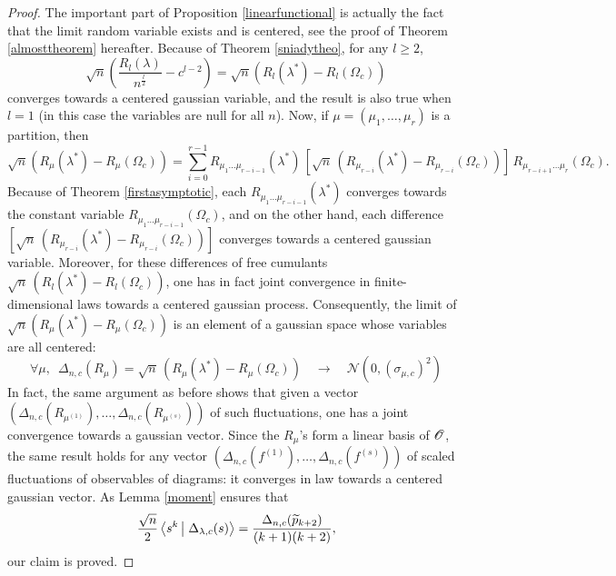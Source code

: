 \documentclass[10pt]{amsart}
\begin{document}
\begin{proof}
The important part of Proposition \ref{linearfunctional} is actually the fact that the limit random variable exists and is centered, see the proof of Theorem \ref{almosttheorem} hereafter. Because of Theorem \ref{sniadytheo}, for any $l\geq 2$, 
$$\sqrt{n}\left(\frac{R_{l}(\lambda)}{n^{\frac{l}{2}}}-c^{l-2}\right)=\sqrt{n}\left(R_{l}(\lambda^{*})-R_{l}(\Omega_{c})\right)$$
converges towards a centered gaussian variable, and the result is also true when $l=1$ (in this case the variables are null for all $n$). Now, if $\mu=(\mu_{1},\ldots,\mu_{r})$ is a partition, then
$$\sqrt{n}\left(R_{\mu}(\lambda^{*})-R_{\mu}(\Omega_{c})\right)=\sum_{i=0}^{r-1}R_{\mu_{1}\ldots\mu_{r-i-1}}(\lambda^{*})\,\left[\sqrt{n}\,(R_{\mu_{r-i}}(\lambda^{*})-R_{\mu_{r-i}}(\Omega_{c}))\right]\,R_{\mu_{r-i+1}\ldots\mu_{r}}(\Omega_{c}).$$
Because of Theorem \ref{firstasymptotic}, each $R_{\mu_{1}\ldots\mu_{r-i-1}}(\lambda^{*})$ converges towards the constant variable $R_{\mu_{1}\ldots\mu_{r-i-1}}(\Omega_{c})$, and on the other hand, each difference $\left[\sqrt{n}\,(R_{\mu_{r-i}}(\lambda^{*})-R_{\mu_{r-i}}(\Omega_{c}))\right]$ converges towards a centered gaussian variable. Moreover, for these differences of free cumulants $\sqrt{n}\,(R_{l}(\lambda^{*})-R_{l}(\Omega_{c}))$, one has in fact joint convergence in finite-dimensional laws towards a centered gaussian process. Consequently, the limit of $\sqrt{n}(R_{\mu}(\lambda^{*})-R_{\mu}(\Omega_{c}))$ is an element of a gaussian space whose variables are all centered:
$$\forall \mu,\,\,\,\Delta_{n,c} (R_{\mu})=\sqrt{n}\,(R_{\mu}(\lambda^{*})-R_{\mu}(\Omega_{c})) \quad\longrightarrow \quad\mathcal{N}(0,(\sigma_{\mu,c})^{2})$$
In fact, the same argument as before shows that given a vector $(\Delta_{n,c}(R_{\mu^{(1)}}), \ldots, \Delta_{n,c}(R_{\mu^{(s)}}))$ of such fluctuations, one has a joint convergence towards a gaussian vector. Since the $R_{\mu}$'s form a linear basis of $\mathscr{O}$, the same result holds for any vector $(\Delta_{n,c}(f^{(1)}),\ldots,\Delta_{n,c}(f^{(s)}))$ of scaled fluctuations of observables of diagrams: it converges in law towards a centered gaussian vector. As Lemma \ref{moment} ensures that
$$\frac{\sqrt{n}}{2}\scal{s^{k}}{\Delta_{\lambda,c}(s)}=\frac{\Delta_{n,c}(\tilp_{k+2})}{(k+1)(k+2)},$$
 our claim is proved.
\end{proof}\bigskip
\end{document}
